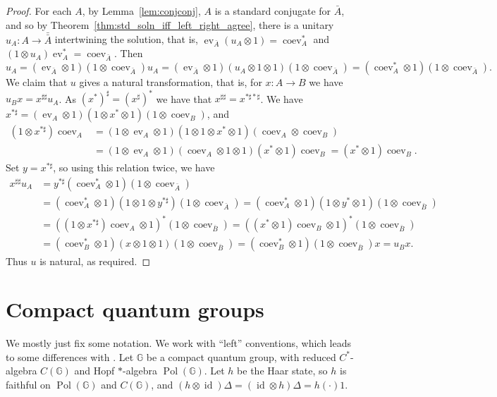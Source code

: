 \documentclass[a4paper,11pt]{article}
\theoremstyle{plain}
\theoremstyle{remark}
\newcommand{\id}{\operatorname{id}}
\newcommand{\G}{\mathbb{G}}
\newcommand{\ev}{\operatorname{ev}}
\newcommand{\coev}{\operatorname{coev}}
\newcommand{\conj}[1]{\bar{#1}}
\newcommand{\Pol}{\operatorname{Pol}}
\begin{document}
\begin{proof}
For each $A$, by Lemma~\ref{lem:conjconj}, $A$ is a standard conjugate for $\conj A$, and so by Theorem~\ref{thm:std_soln_iff_left_right_agree}, there is a unitary $u_A \colon A \to \conj{\conj A}$ intertwining the solution, that is, $\ev_{\conj A}(u_A\otimes 1) = \coev_A^*$ and $(1\otimes u_A)\ev_A^* = \coev_{\conj A}$.  Then
\[ u_A = (\ev_{\conj A} \otimes 1)(1\otimes\coev_{\conj A}) u_A
= (\ev_{\conj A} \otimes 1) (u_A\otimes 1\otimes 1) (1\otimes\coev_{\conj A})
= (\coev_A^*\otimes 1) (1\otimes\coev_{\conj A}). \]
We claim that $u$ gives a natural transformation, that is, for $x\colon A\to B$ we have $u_B x = x^{\sharp\sharp} u_A$.  As $(x^*)^\sharp = (x^\sharp)^*$ we have that $x^{\sharp\sharp} = x^{*\sharp * \sharp}$.  We have $x^{*\sharp} = (\ev_A\otimes 1)(1\otimes x^*\otimes 1)(1\otimes\coev_B)$, and
\begin{align*}
(1\otimes x^{*\sharp}) \coev_A
&= (1\otimes\ev_A\otimes 1)(1\otimes 1\otimes x^*\otimes 1)(\coev_A\otimes\coev_B)   \\
&= (1\otimes\ev_A\otimes 1)(\coev_A\otimes 1\otimes 1)(x^*\otimes 1)\coev_B
= (x^*\otimes 1)\coev_B.
\end{align*}
Set $y = x^{*\sharp}$, so using this relation twice, we have
\begin{align*}
x^{\sharp\sharp} u_A
&= y^{*\sharp} (\coev_A^*\otimes 1) (1\otimes\coev_{\conj A}) \\
&= (\coev_A^*\otimes 1) (1\otimes 1\otimes y^{*\sharp}) (1\otimes\coev_{\conj A})
= (\coev_A^*\otimes 1) (1\otimes y^*\otimes 1) (1\otimes \coev_{\conj B}) \\
&= ((1\otimes x^{*\sharp})\coev_A \otimes 1)^*(1\otimes \coev_{\conj B})
= ((x^*\otimes 1)\coev_B \otimes 1)^*(1\otimes \coev_{\conj B}) \\
&= (\coev_B^*\otimes 1) (x\otimes 1\otimes 1) (1\otimes \coev_{\conj B})
=  (\coev_B^*\otimes 1) (1\otimes \coev_{\conj B}) x
= u_B x.
\end{align*}
Thus $u$ is natural, as required.
\end{proof}




\section{Compact quantum groups}

We mostly just fix some notation.  We work with ``left'' conventions, which leads to some differences with \cite{NT_CQGsBook}.
Let $\G$ be a compact quantum group, with reduced $C^*$-algebra $C(\G)$ and Hopf $*$-algebra $\Pol(\G)$.  Let $h$ be the Haar state, so $h$ is faithful on $\Pol(\G)$ and $C(\G)$, and $(h\otimes\id)\Delta = (\id\otimes h)\Delta = h(\cdot) 1$.
\end{document}
